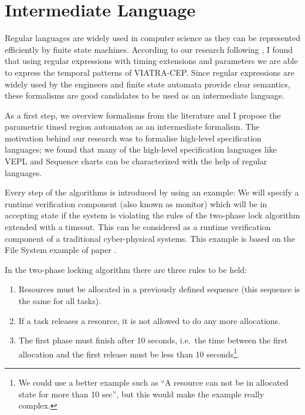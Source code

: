 	\chapter{Intermediate Language}
	\label{chap:cep}
	
	
	Regular languages are widely used in computer science as they can be represented efficiently by finite state machines.		
	According to our research following \citep{davidi}, I found that using regular expressions with timing extensions and parameters we are able to express the temporal patterns of VIATRA-CEP.
	Since regular expressions are widely used by the engineers and finite state automata provide clear semantics, these formalisms are good candidates to be used as an intermediate language.
	
	As a first step, we overview formalisms from the literature and I propose the parametric timed region automaton as an intermediate formalism.
	The motivation behind our research was to formalise high-level specification languages; we found that many of the high-level specification languages like VEPL and Sequence charts can be characterized with the help of regular languages.%
	
	Every step of the algorithms is introduced by using an example: 
	We will specify a runtime verification component (also known as monitor) which will be in accepting state if the system is violating the rules of the two-phase lock algorithm extended with a timeout.
	This can be considered as a runtime verification component of a traditional cyber-physical systems. This example is based on the File System example of paper \citep{marq}.
	
	In the two-phase locking algorithm there are three rules to be held:
	\begin{enumerate}
		\item Resources must be allocated in a previously defined sequence (this sequence is the same for all tasks).
		\item If a task releases a resource, it is not allowed to do any more allocations.
		\item The first phase must finish after 10 seconds, i.e.~the time between the first allocation and the first release must be less than 10 seconds\footnote{We could use a better example such as ``A resource can not be in allocated state for more than 10 sec'', but this would make the example really complex.}. 
	\end{enumerate}
	

